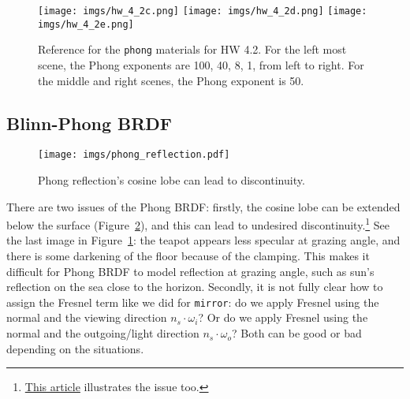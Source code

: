 \begin{figure}[ht]
    \centering
    \texttt{[image: imgs/hw\_4\_2c.png]}
    \texttt{[image: imgs/hw\_4\_2d.png]}
    \texttt{[image: imgs/hw\_4\_2e.png]}
    \caption{Reference for the \lstinline{phong} materials for HW 4.2. For the left most scene, the Phong exponents are 100, 40, 8, 1, from left to right. For the middle and right scenes, the Phong exponent is 50.}
    \label{fig:hw_4_2_phong}
\end{figure}

\subsection{Blinn-Phong BRDF}
\begin{figure}[ht]
    \centering
    \texttt{[image: imgs/phong\_reflection.pdf]}
    \caption{Phong reflection's cosine lobe can lead to discontinuity.}
    \label{fig:phong_reflection}
\end{figure}

There are two issues of the Phong BRDF: firstly, the cosine lobe can be extended below the surface (Figure~\ref{fig:phong_reflection}), and this can lead to undesired discontinuity.\footnote{\href{https://learnopengl.com/Advanced-Lighting/Advanced-Lighting}{This article} illustrates the issue too.} See the last image in Figure~\ref{fig:hw_4_2_phong}: the teapot appears less specular at grazing angle, and there is some darkening of the floor because of the clamping. This makes it difficult for Phong BRDF to model reflection at grazing angle, such as sun's reflection on the sea close to the horizon.
Secondly, it is not fully clear how to assign the Fresnel term like we did for \lstinline{mirror}: do we apply Fresnel using the normal and the viewing direction $n_s \cdot \omega_i$? Or do we apply Fresnel using the normal and the outgoing/light direction $n_s \cdot \omega_o$? Both can be good or bad depending on the situations.

